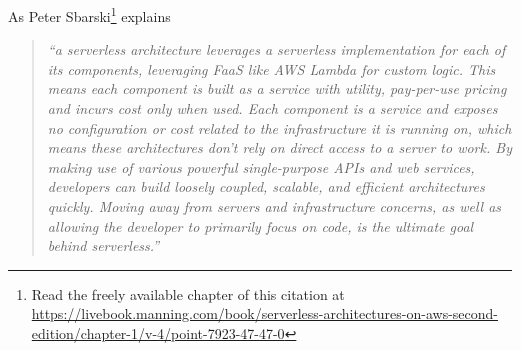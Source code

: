 As Peter Sbarski\footnote{ Read the freely available chapter of this
  citation at
  \url{https://livebook.manning.com/book/serverless-architectures-on-aws-second-edition/chapter-1/v-4/point-7923-47-47-0}}
explains~\cite{sbarski2017serverless}
\begin{quote}
  \textit{``a serverless architecture leverages a serverless
    implementation for each of its components, leveraging FaaS like
    AWS Lambda for custom logic. This means each component is built as
    a service with utility, pay-per-use pricing and incurs cost only
    when used. Each component is a service and exposes no
    configuration or cost related to the infrastructure it is running
    on, which means these architectures don’t rely on direct access to
    a server to work.  By making use of various powerful
    single-purpose APIs and web services, developers can build loosely
    coupled, scalable, and efficient architectures quickly. Moving
    away from servers and infrastructure concerns, as well as allowing
    the developer to primarily focus on code, is the ultimate goal
    behind serverless.''}
\end{quote}



